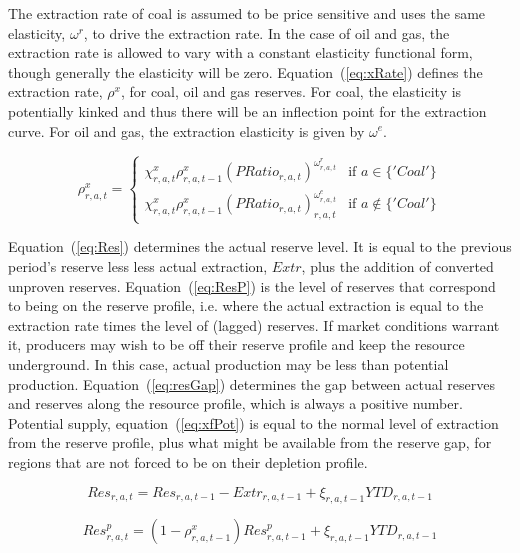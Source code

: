 \documentclass[11pt,letterpaper]{report}
\begin{document}
The extraction rate of coal is assumed to be price
sensitive and uses the same elasticity, $\omega^r$, to drive
the extraction rate. In the case of oil and gas, the
extraction rate is allowed to vary with a constant
elasticity functional form, though generally the
elasticity will be zero. Equation~(\ref{eq:xRate})
defines the extraction rate, $\rho^x$, for coal, oil and gas reserves.
For coal, the elasticity is potentially kinked and thus
there will be an inflection point for the extraction curve.
For oil and gas, the extraction elasticity is given by $\omega^e$.

\begin{equation}
\label{eq:xRate}
\rho^x_{r,a,t} =
\begin{cases}
\chi^x_{r,a,t} \rho^x_{r,a,t-1} \left( \mathit{PRatio}_{r,a,t} \right)^{\omega^r_{r,a,t}} & \textrm{if } a \in \{'Coal'\} \\
\chi^x_{r,a,t} \rho^x_{r,a,t-1} \left( \mathit{PRatio}_{r,a,t} \right)_{r,a,t}^{\omega^e_{r,a,t}} & \textrm{if } a \notin \{'Coal'\}
\end{cases}
\end{equation}

Equation~(\ref{eq:Res}) determines the actual reserve
level. It is equal to the previous period's reserve less
less actual extraction, $\mathit{Extr}$, plus the addition
of converted unproven reserves. Equation~(\ref{eq:ResP})
is the level of reserves that correspond to being on the
reserve profile, i.e. where the actual extraction is
equal to the extraction rate times the level of (lagged) reserves.
If market conditions warrant it, producers may wish to be
off their reserve profile and keep the resource underground. In
this case, actual production may be less than potential production.
Equation~(\ref{eq:resGap}) determines the gap between
actual reserves and reserves along the resource profile,
which is always a positive number.
Potential supply, equation~(\ref{eq:xfPot}) is equal to the normal level of
extraction from the reserve profile, plus what might
be available from the reserve gap, for regions that
are not forced to be on their depletion profile.

\begin{equation}
\label{eq:Res}
\mathit{Res}_{r,a,t} = \mathit{Res}_{r,a,t-1} - \mathit{Extr}_{r,a,t-1} + \xi_{r,a,t-1} \mathit{YTD}_{r,a,t-1}
\end{equation}

\begin{equation}
\label{eq:ResP}
\mathit{Res}^p_{r,a,t} = \left(1 - \rho^x_{r,a,t-1} \right) \mathit{Res}^p_{r,a,t-1} + \xi_{r,a,t-1} \mathit{YTD}_{r,a,t-1}
\end{equation}
\end{document}
